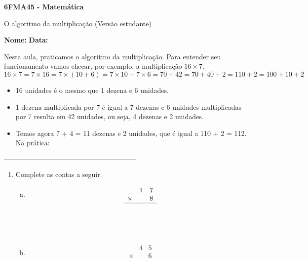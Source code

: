 \documentclass[a4paper,14pt]{article}
\begin{document}
	
	\noindent\textbf{6FMA45 - Matemática} 
	
	\begin{center}O algoritmo da multiplicação (Versão estudante)
	\end{center}
	
	\noindent\textbf{Nome:} \underline{\hspace{10cm}}
	\noindent\textbf{Data:} \underline{\hspace{4cm}}
	
	\begin{multicols}{2}
		\noindent Nesta aula, praticamos o algoritmo da multiplicação. Para entender seu funcionamento vamos checar, por exemplo, a multiplicação $16 \times 7$. \\
		$16 \times 7 = 7 \times 16 = 7 \times (10 + 6) = 7 \times 10 + 7 \times 6 = 70 + 42 = 70 + 40 + 2 = 110 + 2 = 100 + 10 + 2$
		\begin{itemize}
			\item 16 unidades é o mesmo que 1 dezena e 6 unidades.
			\item 1 dezena multiplicada por 7 é igual a 7 dezenas e 6 unidades multiplicadas por 7 resulta em 42 unidades, ou seja, 4 dezenas e 2 unidades.
			\item Temos agora 7 + 4 = 11 dezenas e 2 unidades, que é igual a 110 + 2 = 112.\\
			Na prática:
		\end{itemize}
	\textsubscript{---------------------------------------------------------------------}
    	\begin{enumerate}
    		\item Complete as contas a seguir.
    		\begin{enumerate}[a)]
    		\item \[
    		\begin{array}{ccc}
    			~ & 1 & 7 \\
    			\times & ~ & 8 \\
    			\hline
    		\end{array}
    		\] \\\\\\
    		\item \[
    		\begin{array}{ccc}
    			~ & 4 & 5 \\
    			\times & ~ & 6 \\

\end{array}\]
\end{enumerate}
\end{enumerate}
\end{multicols}
\end{document}
